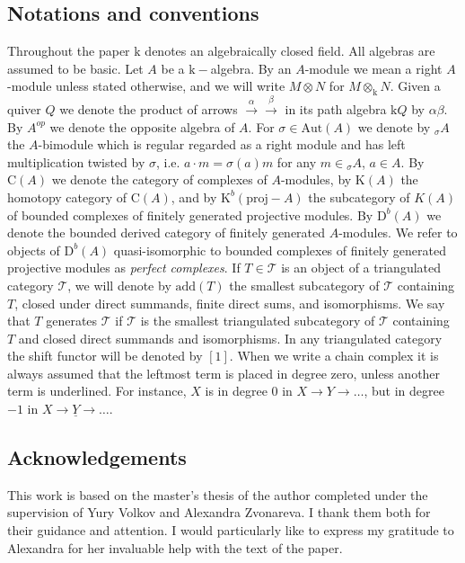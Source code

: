 \documentclass[12pt]{amsart}
\theoremstyle{plain}
\theoremstyle{remark}
\theoremstyle{definition}
\newcommand{\proj}{{\mathrm{proj}}}
\newcommand{\Aut}{{\mathrm{Aut}}}
\newcommand{\add}{{\mathrm{add}}}
\newcommand{\D}{{\mathrm{D}}}
\newcommand{\Cmp}{{\mathrm{C}}}
\newcommand{\K}{{\mathrm{K}}}
\def\kk{\mathrm{k}}
\begin{document}
\subsection{Notations and conventions}
Throughout the paper $\kk$ denotes an algebraically closed field. All algebras are assumed to be basic. Let $A$ be a $\kk-$algebra. By an $A$-module we mean a right $A$-module unless stated otherwise, and we will write $M \otimes N$ for $M \otimes_\kk N$. Given a quiver $Q$ we denote the product of arrows $\xrightarrow{\alpha}\xrightarrow{\beta}$ in its path algebra $\kk Q$ by $\alpha\beta$. By $A^{op}$ we denote the opposite algebra of $A$. For $\sigma \in \Aut(A)$ we denote by  ${}_\sigma A$ the $A$-bimodule which is regular regarded as a right module and has left multiplication twisted by $\sigma$, i.e. $a \cdot m = \sigma(a)m$ for any $m \in {}_\sigma A$, $a \in A$. By $\Cmp(A)$ we denote the category of complexes of $A$-modules, by $\K(A)$ the homotopy category of $\Cmp(A)$, and by $\K^b(\proj-A)$ the subcategory of $K(A)$ of bounded complexes of finitely generated projective modules. By $\D^b(A)$ we denote the bounded derived category of finitely generated $A$-modules. We refer to objects of $\D^b(A)$ quasi-isomorphic to bounded complexes of finitely generated projective modules as {\it perfect complexes}. If $T \in \mathcal{T}$ is an object of a triangulated category $\mathcal{T}$, we will denote by $\add(T)$ the smallest subcategory of $\mathcal{T}$ containing $T$, closed under direct summands, finite direct sums, and isomorphisms. We say that $T$ generates $\mathcal{T}$ if $\mathcal{T}$ is the smallest triangulated subcategory of $\mathcal{T}$ containing $T$ and closed direct summands and isomorphisms. In any triangulated category the shift functor will be denoted by $[1]$. When we write a chain complex it is always assumed that the leftmost term is placed in degree zero, unless another term is underlined. For instance, $X$ is in degree $0$ in $X \xrightarrow{} Y \xrightarrow{} \dots$, but in degree $-1$ in $X \xrightarrow{} \underline{Y} \xrightarrow{} \dots$. 

\subsection{Acknowledgements} 
This work is based on the master's thesis of the author completed under the supervision of Yury Volkov and Alexandra Zvonareva. I thank them both for their guidance and attention. I would particularly like to express my gratitude to Alexandra for her invaluable help with the text of the paper.  
\end{document}
